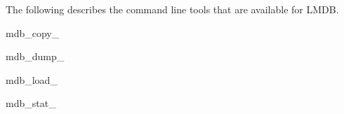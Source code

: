 The following describes the command line tools that are available for L\+M\+DB. \begin{DoxyItemize}
\item mdb\+\_\+copy\+\_ \item mdb\+\_\+dump\+\_ \item mdb\+\_\+load\+\_ \item mdb\+\_\+stat\+\_ \end{DoxyItemize}
